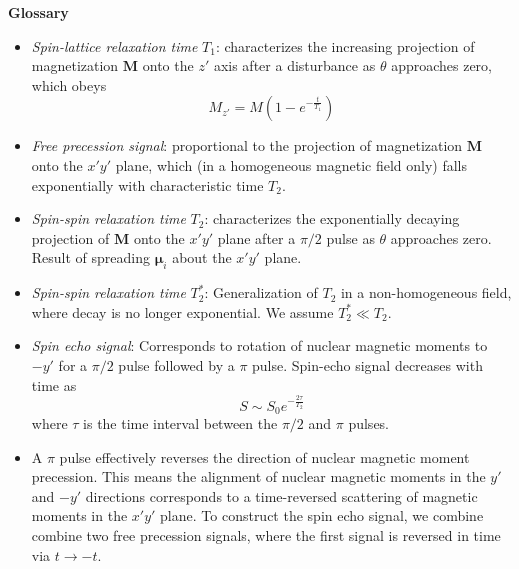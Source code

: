 \documentclass[11pt, a4paper]{article}
\renewcommand{\vec}[1]{\bm{#1}}
\newcommand{\m}{\vec{\mu}}  %
\newcommand{\M}{\vec{M}}  %
\begin{document}
\newpage
\textbf{Glossary}
\begin{itemize}	
	\item \textit{Spin-lattice relaxation time}  $ T_{1} $: characterizes the increasing projection of magnetization $ \M $ onto the $ z' $ axis after a disturbance as $ \theta $ approaches zero, which obeys
	\begin{equation*}
		M_{z'} = M\left(1-e^{-\frac{t}{T_{1}}}\right)
	\end{equation*}
	
	\item \textit{Free precession signal}: proportional to the projection of magnetization $ \M $ onto the $ x'y' $ plane, which (in a homogeneous magnetic field only) falls exponentially with characteristic time $ T_{2} $.

	
	
	\item \textit{Spin-spin relaxation time} $ T_{2} $: characterizes the exponentially decaying projection of $ \M $ onto the $ x'y' $ plane after a $ \pi/2 $ pulse as $ \theta $ approaches zero. Result of spreading $ \m_{i} $ about the $ x'y' $ plane.
	
	\item \textit{Spin-spin relaxation time} $ T_{2}^{*} $: Generalization of $ T_{2} $ in a non-homogeneous field, where decay is no longer exponential. We assume $ T_{2}^{*} \ll T_{2} $.
	

	\item \textit{Spin echo signal}: Corresponds to rotation of nuclear magnetic moments to $ -y' $ for a $ \pi/2 $ pulse followed by a $ \pi $ pulse. Spin-echo signal decreases with time as
	\begin{equation*}
		S \sim S_{0}e^{-\frac{2\tau}{T_{2}}}
	\end{equation*}
	where $ \tau $ is the time interval between the $ \pi/2 $ and $ \pi $ pulses.
	
	

	\item A $ \pi $ pulse effectively reverses the direction of nuclear magnetic moment precession. This means the alignment of nuclear magnetic moments in the $ y' $ and $ -y' $ directions corresponds to a time-reversed scattering of magnetic moments in the $ x'y' $ plane. To construct the spin echo signal, we combine combine two free precession signals, where the first signal is reversed in time via $ t \to -t $. 
		
\end{itemize}
\end{document}
